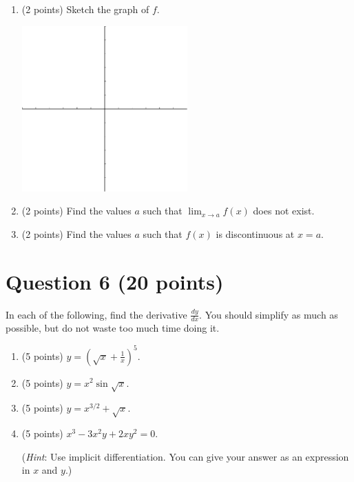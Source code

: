 \documentclass{article}
\begin{document}
        \begin{enumerate}[label=(\alph*)]
            \item (2 points) Sketch the graph of $f$.

            \vspace{1cm}
            \begin{center}
            \includegraphics[width=0.5\textwidth]{blank.pdf}
            \end{center}
            \vspace{\fill}
            \item (2 points) Find the values $a$ such that
                $\displaystyle\lim_{x\to a}{f(x)}$ does not exist.
                \vspace{\fill}
            \item (2 points) Find the values $a$ such that $f(x)$ is
                discontinuous at $x=a$.
                \vspace{\fill}

        \end{enumerate}

\pagebreak

\section*{Question 6 (20 points)}
In each of the following, find the derivative $\frac{dy}{dx}$. You should simplify as much as possible, but do not waste too much time doing it.


    \begin{enumerate}[label=(\alph*)]
        \item (5 points) $y=\left( \sqrt{x}+\frac{1}{x} \right)^5$.
        \vspace{1.5in}
        \item (5 points) $y= x^2 \sin{\sqrt{x}}$.
        \vspace{2in}
        \item (5 points) $y=x^{3/2}+\sqrt{x}$.
        \vspace{1.5in}
        \item (5 points) $x^3-3x^2y+2xy^2=0$.

        (\textit{Hint}: Use implicit differentiation. You can give your answer as an expression in $x$ and $y$.)

    \end{enumerate}
\end{document}
